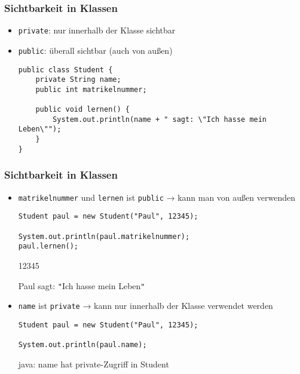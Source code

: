\documentclass{../../presentation}
\begin{document}
\begin{frame}[fragile]
	\frametitle{Sichtbarkeit in Klassen}
	\pause
	\begin{itemize}
		\item \texttt{private}: nur innerhalb der Klasse sichtbar
		      \pause
		\item \texttt{public}: überall sichtbar (auch von außen)
		      \pause
		      \begin{verbatim}
public class Student {
    private String name;         
    public int matrikelnummer;   

    public void lernen() {
        System.out.println(name + " sagt: \"Ich hasse mein Leben\"");
    }
}
	\end{verbatim}
	\end{itemize}
\end{frame}



\begin{frame}[fragile]
	\frametitle{Sichtbarkeit in Klassen}
	\pause
	\begin{itemize}
		\item\texttt{matrikelnummer} und \texttt{lernen} ist \texttt{public} → kann man von außen verwenden
		      \begin{verbatim}
Student paul = new Student("Paul", 12345);

System.out.println(paul.matrikelnummer);
paul.lernen();
  \end{verbatim}
		      \pause
		      {\begin{ausgabe}
				      12345


				      Paul sagt: \texttt{"}Ich hasse mein Leben\texttt{"}
			      \end{ausgabe}}
		      \pause
		\item \texttt{name} ist \texttt{private} → kann nur innerhalb der Klasse verwendet werden
		      \begin{verbatim}
Student paul = new Student("Paul", 12345);

System.out.println(paul.name);
  \end{verbatim}
		      \pause
		      \begin{ausgabe}
			      \alert{java: name hat private-Zugriff in Student}
		      \end{ausgabe}
	\end{itemize}
\end{frame}
\end{document}
